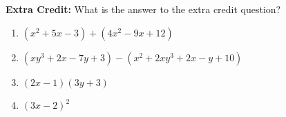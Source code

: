 \documentclass[12pt]{article}
\begin{document}
\vspace{.5in}

\textbf{Extra Credit:} What is the answer to the extra credit question?

\pagebreak

\begin{enumerate}
\item $(x^2+5x-3)+(4x^2-9x+12)$\\

\item $(xy^3+2x-7y+3)-(x^2+2xy^3+2x-y+10)$\\

\item $(2x-1)(3y+3)$\\

\item $(3x-2)^2$\\
\end{enumerate}
\end{document}
